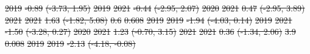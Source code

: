 \documentclass[
  letterpaper,
  DIV=11,
  numbers=noendperiod]{scrartcl}
\providecommand{\DIFdel}[1]{{\protect\color{red}\sout{#1}}}                      %
\providecommand{\DIFdelFL}[1]{\DIFdel{#1}} %
\begin{document}
\DIFdelFL{2019 }%
\DIFdelFL{-0.89 }%
\DIFdelFL{(-3.73, 1.95) }%
\DIFdelFL{\hspace{1em}2019 }%
\DIFdelFL{2021 }%
\DIFdelFL{-0.44 }%
\DIFdelFL{(-2.95, 2.07) }%
\DIFdelFL{\hspace{1em}2020 }%
\DIFdelFL{2021 }%
\DIFdelFL{0.47 }%
\DIFdelFL{(-2.95, 3.89) }%
\DIFdelFL{\hspace{1em}2021 }%
\DIFdelFL{2021 }%
\DIFdelFL{1.63 }%
\DIFdelFL{(-1.82, 5.08) }%
\DIFdelFL{0.6 }%
\DIFdelFL{0.608}%
\DIFdelFL{\hspace{1em}2019 }%
\DIFdelFL{2019 }%
\DIFdelFL{-1.94 }%
\DIFdelFL{(-4.03, 0.14) }%
\DIFdelFL{\hspace{1em}2019 }%
\DIFdelFL{2021 }%
\DIFdelFL{-1.50 }%
\DIFdelFL{(-3.28, 0.27) }%
\DIFdelFL{\hspace{1em}2020 }%
\DIFdelFL{2021 }%
\DIFdelFL{1.23 }%
\DIFdelFL{(-0.70, 3.15) }%
\DIFdelFL{\hspace{1em}2021 }%
\DIFdelFL{2021 }%
\DIFdelFL{0.36 }%
\DIFdelFL{(-1.34, 2.06) }%
\DIFdelFL{3.9 }%
\DIFdelFL{0.008}%
\DIFdelFL{\hspace{1em}2019 }%
\DIFdelFL{2019 }%
\DIFdelFL{-2.13 }%
\DIFdelFL{(-4.18, -0.08) }%
\end{document}
